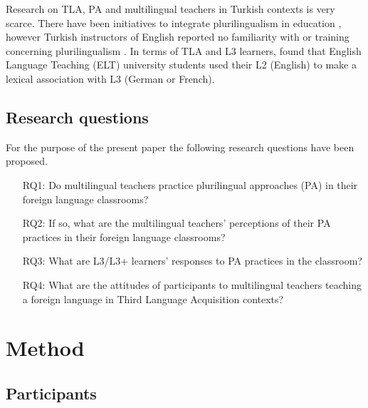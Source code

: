 \documentclass[output=paper]{../langscibook}
\begin{document}
Research on TLA, PA and multilingual teachers in Turkish contexts is very scarce. There have been initiatives to integrate plurilingualism in education \citep{Mirici2008}, however Turkish instructors of English reported no familiarity with or training concerning plurilingualism \citep{Celik2013}. In terms of TLA and L3 learners, \citet{Korkmaz2013} found that English Language Teaching (ELT) university students used their L2 (English) to make a lexical association with L3 (German or French).



\subsection{Research questions}

For the purpose of the present paper the following research questions have been proposed.

\begin{itemize}
\item [RQ1:] Do multilingual teachers practice plurilingual approaches (PA) in their foreign language classrooms?
\item [RQ2:] If so, what are the multilingual teachers’ perceptions of their PA practices in their foreign language classrooms?
\item [RQ3:] What are L3/L3+ learners’ responses to PA practices in the classroom?
\item [RQ4:] What are the attitudes of participants to multilingual teachers teaching a foreign language in Third Language Acquisition contexts?
\end{itemize}


\section{Method}


\subsection{Participants}
\end{document}
